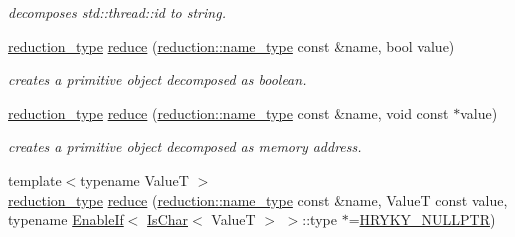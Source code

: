 \begin{DoxyCompactItemize}
\begin{DoxyCompactList}\small\item\em decomposes std\-::thread\-::id to string. \end{DoxyCompactList}\item 
\hypertarget{namespacehryky_aaf2d44a2e399b7bdb8fdb275fd7fb597}{\hyperlink{namespacehryky_a343a9a4c36a586be5c2693156200eadc}{reduction\-\_\-type} \hyperlink{namespacehryky_aaf2d44a2e399b7bdb8fdb275fd7fb597}{reduce} (\hyperlink{namespacehryky_1_1reduction_ac686c30a4c8d196bbd0f05629a6b921f}{reduction\-::name\-\_\-type} const \&name, bool value)}\label{namespacehryky_aaf2d44a2e399b7bdb8fdb275fd7fb597}

\begin{DoxyCompactList}\small\item\em creates a primitive object decomposed as boolean. \end{DoxyCompactList}\item 
\hypertarget{namespacehryky_a971b32beeea5bf76289d420c69a64df4}{\hyperlink{namespacehryky_a343a9a4c36a586be5c2693156200eadc}{reduction\-\_\-type} \hyperlink{namespacehryky_a971b32beeea5bf76289d420c69a64df4}{reduce} (\hyperlink{namespacehryky_1_1reduction_ac686c30a4c8d196bbd0f05629a6b921f}{reduction\-::name\-\_\-type} const \&name, void const $\ast$value)}\label{namespacehryky_a971b32beeea5bf76289d420c69a64df4}

\begin{DoxyCompactList}\small\item\em creates a primitive object decomposed as memory address. \end{DoxyCompactList}\item 
\hypertarget{namespacehryky_a328d36b3d03e02e1a7cae6093bb0a0c8}{{\footnotesize template$<$typename Value\-T $>$ }\\\hyperlink{namespacehryky_a343a9a4c36a586be5c2693156200eadc}{reduction\-\_\-type} \hyperlink{namespacehryky_a328d36b3d03e02e1a7cae6093bb0a0c8}{reduce} (\hyperlink{namespacehryky_1_1reduction_ac686c30a4c8d196bbd0f05629a6b921f}{reduction\-::name\-\_\-type} const \&name, Value\-T const value, typename \hyperlink{classhryky_1_1_enable_if}{Enable\-If}$<$ \hyperlink{classhryky_1_1_is_char}{Is\-Char}$<$ Value\-T $>$ $>$\-::type $\ast$=\hyperlink{common_8h_a4cd4ac09cfcdbd6b30ee69afc156e210}{H\-R\-Y\-K\-Y\-\_\-\-N\-U\-L\-L\-P\-T\-R})}\label{namespacehryky_a328d36b3d03e02e1a7cae6093bb0a0c8}


\end{DoxyCompactItemize}
